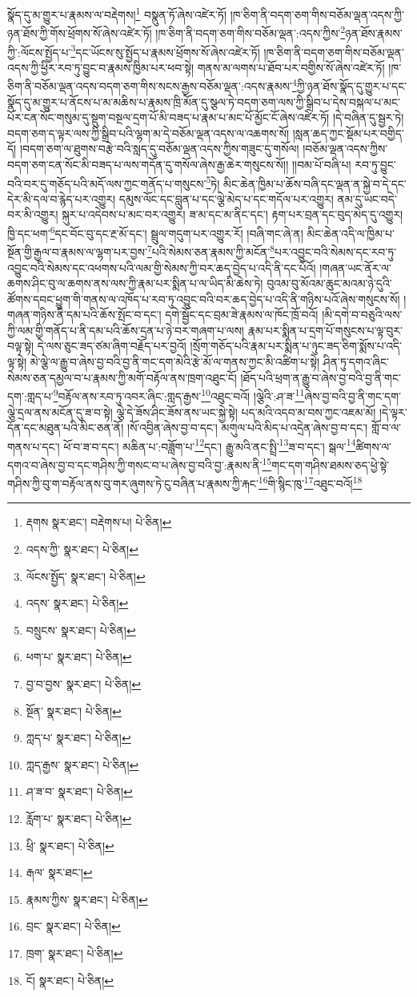 སྣོད་དུ་མ་གྱུར་པ་རྣམས་ལ་བརྡེགས།\footnote{རྡགས  སྣར་ཐང་། བརྡེགས་པ།  པེ་ཅིན། } བསྣུན་ཏོ་ཞེས་འཛེར་ཏོ། །ཁ་ཅིག་ནི་བདག་ཅག་གིས་བཅོམ་ལྡན་འདས་ཀྱི་ཉན་ཐོས་ཀྱི་གོས་ཕྲོགས་སོ་ཞེས་འཛེར་ཏོ། །ཁ་ཅིག་ནི་བདག་ཅག་གིས་བཅོམ་ལྡན་:འདས་ཀྱིས་\footnote{འདས་ཀྱི་  སྣར་ཐང་།  པེ་ཅིན། }ཉན་ཐོས་རྣམས་ཀྱི་:ལོངས་སྤྱོད་པ་\footnote{ལོངས་སྤྱོད་  སྣར་ཐང་།  པེ་ཅིན། }དང་ཡོངས་སུ་སྤྱོད་པ་རྣམས་ཕྲོགས་སོ་ཞེས་འཛེར་ཏོ། །ཁ་ཅིག་ནི་བདག་ཅག་གིས་བཅོམ་ལྡན་འདས་ཀྱི་ཕྱིར་རབ་ཏུ་བྱུང་བ་རྣམས་ཁྱིམ་པར་ཕབ་སྟེ། གནས་མ་ལགས་པ་ཐོབ་པར་བགྱིས་སོ་ཞེས་འཛེར་ཏོ། །ཁ་ཅིག་ནི་བཅོམ་ལྡན་འདས་བདག་ཅག་གིས་སངས་རྒྱས་བཅོམ་ལྡན་:འདས་རྣམས་\footnote{འདས་  སྣར་ཐང་།  པེ་ཅིན། }ཀྱི་ཉན་ཐོས་སྣོད་དུ་གྱུར་པ་དང་སྣོད་དུ་མ་གྱུར་པ་ནོངས་པ་མ་མཆིས་པ་རྣམས་ཁྲི་མོན་དུ་སྩལ་ཏེ་བདག་ཅག་ལས་ཀྱི་སྒྲིབ་པ་དེས་བསྐལ་པ་མང་པོར་ངན་སོང་གསུམ་དུ་སྡུག་བསྔལ་དྲག་པོ་མི་བཟད་པ་རྣམ་པ་མང་པོ་མྱོང་ངོ་ཞེས་འཛེར་ཏོ། །དེ་བཞིན་དུ་སྦྱར་ཏེ། བདག་ཅག་ད་ལྟར་ལས་ཀྱི་སྒྲིབ་པའི་ལྷག་མ་དེ་བཅོམ་ལྡན་འདས་ལ་འཆགས་སོ། །སླན་ཆད་ཀྱང་སྡོམ་པར་བགྱིད་དོ། །བདག་ཅག་ལ་ཐུགས་བརྩེ་བའི་སླད་དུ་བཅོམ་ལྡན་འདས་ཀྱིས་གཟུང་དུ་གསོལ། །བཅོམ་ལྡན་འདས་ཀྱིས་བདག་ཅག་ངན་སོང་མི་བཟད་པ་ལས་གདོན་དུ་གསོལ་ཞེས་རྒྱ་ཆེར་གསུངས་སོ།། །།བམ་པོ་བཞི་པ། རབ་ཏུ་བྱུང་བའི་བར་དུ་གཅོད་པའི་མདོ་ལས་ཀྱང་གནོད་པ་གསུངས་\footnote{བསྲུངས་  སྣར་ཐང་།  པེ་ཅིན། }ཏེ། མིང་ཆེན་ཁྱིམ་པ་ཆོས་བཞི་དང་ལྡན་ན་སྐྱེ་བ་དེ་དང་དེར་མི་དལ་བ་རྙེད་པར་འགྱུར། དམུས་ལོང་དང་བླུན་པ་དང་ལྕེ་མེད་པ་དང་གདོལ་པར་འགྱུར། ནམ་དུ་ཡང་བདེ་བར་མི་འགྱུར། སྐུར་པ་འདེབས་པ་མང་བར་འགྱུར། ཟ་མ་དང་མ་ནིང་དང་། རྟག་པར་བྲན་དང་བུད་མེད་དུ་འགྱུར། ཁྱི་དང་ཕག་\footnote{ཕག་པ་  སྣར་ཐང་།  པེ་ཅིན། }དང་བོང་བུ་དང་རྔ་མོ་དང་། སྦྲུལ་གདུག་པར་འགྱུར་རོ། །བཞི་གང་ཞེ་ན། མིང་ཆེན་འདི་ལ་ཁྱིམ་པ་སྔོན་གྱི་རྒྱལ་བ་རྣམས་ལ་ལྷག་པར་བྱས་\footnote{བྱ་བ་བྱས་  སྣར་ཐང་།  པེ་ཅིན། }པའི་སེམས་ཅན་རྣམས་ཀྱི་མངོན་\footnote{སྔོན་  སྣར་ཐང་།  པེ་ཅིན། }པར་འབྱུང་བའི་སེམས་དང་རབ་ཏུ་འབྱུང་བའི་སེམས་དང་འཕགས་པའི་ལམ་གྱི་སེམས་ཀྱི་བར་ཆད་བྱེད་པ་འདི་ནི་དང་པོའོ། །གཞན་ཡང་ནོར་ལ་ཆགས་ཤིང་བུ་ལ་ཆགས་ནས་ལས་ཀྱི་རྣམ་པར་སྨིན་པ་ལ་ཡིད་མི་ཆེས་ཏེ། བུའམ་བུ་མོའམ་ཆུང་མའམ་ཉེ་དུའི་ཚོགས་དབང་ཕྱུག་གི་གནས་ལ་འཁོད་པ་རབ་ཏུ་འབྱུང་བའི་བར་ཆད་བྱེད་པ་འདི་ནི་གཉིས་པའོ་ཞེས་གསུངས་སོ། །གཞན་གཉིས་ནི་དམ་པའི་ཆོས་སྤོང་བ་དང་། དགེ་སྦྱོང་དང་བྲམ་ཟེ་རྣམས་ལ་ཁོང་ཁྲོ་བའོ། །མི་དགེ་བ་བཅུའི་ལས་ཀྱི་ལམ་གྱི་གནོད་པ་ནི་དམ་པའི་ཆོས་དྲན་པ་ཉེ་བར་གཞག་པ་ལས། རྣམ་པར་སྨིན་པ་དྲག་པོ་གསུངས་པ་ལྟ་བུར་བལྟ་སྟེ། དེ་ལས་ཅུང་ཟད་ཙམ་ཞིག་བརྗོད་པར་བྱའོ། །སྲོག་གཅོད་པའི་རྣམ་པར་སྨིན་པ་ཉུང་ཟད་ཅིག་སྨོས་པ་འདི་ལྟ་སྟེ། མེ་ལྕེ་ལ་རྒྱུ་བ་ཞེས་བྱ་བའི་བྱ་ནི་གང་དག་མེའི་རྩེ་མོ་ལ་གནས་ཀྱང་མི་འཚིག་པ་སྟེ། ཤིན་ཏུ་དགའ་ཞིང་སེམས་ཅན་དམྱལ་བ་པ་རྣམས་ཀྱི་མགོ་བརྟོལ་ནས་ཁྲག་འཐུང་ངོ། །ཐོད་པའི་ཕྲག་ན་རྒྱུ་བ་ཞེས་བྱ་བའི་བྱ་ནི་གང་དག་:གླད་པ་\footnote{ཀླད་པ་  སྣར་ཐང་།  པེ་ཅིན། }བརྟོལ་ནས་རབ་ཏུ་འབར་ཞིང་:གླད་རྒྱས་\footnote{ཀླད་རྒྱས་  སྣར་ཐང་།  པེ་ཅིན། }འཐུང་བའོ། །ལྕེའི་:ཤ་ཟ་\footnote{ཤ་ཟ་བ་  སྣར་ཐང་།  པེ་ཅིན། }ཞེས་བྱ་བའི་བྱ་ནི་གང་དག་ལྕེ་དྲལ་ནས་མངོན་དུ་ཟ་བ་སྟེ། ལྕེ་དེ་ཟོས་ཤིང་ཟོས་ནས་ཡང་སྐྱེ་སྟེ། པད་མའི་འདབ་མ་བས་ཀྱང་འཇམ་མོ། །དེ་ལྟར་དོན་དང་མཐུན་པའི་མིང་ཅན་ནོ། །སོ་འབྱིན་ཞེས་བྱ་བ་དང་། མགུལ་པའི་མིད་པ་འདྲེན་ཞེས་བྱ་བ་དང་། གློ་བ་ལ་གནས་པ་དང་། ཕོ་བ་ཟ་བ་དང་། མཆིན་པ་:བཟློག་པ་\footnote{རློག་པ་  སྣར་ཐང་།  པེ་ཅིན། }དང་། རྒྱུ་མའི་ནང་སྤྲི་\footnote{ཕྲི་  སྣར་ཐང་།  པེ་ཅིན། }ཟ་བ་དང་། སྒལ་\footnote{རྒལ་  སྣར་ཐང་། }ཚིགས་ལ་དགའ་བ་ཞེས་བྱ་བ་དང་གཤིས་ཀྱི་གསང་བ་པ་ཞེས་བྱ་བའི་བྱ་:རྣམས་ནི་\footnote{རྣམས་ཀྱིས་  སྣར་ཐང་།  པེ་ཅིན། }གང་དག་གཤིས་ཐམས་ཅད་ཕྱེ་སྟེ་གཤིས་ཀྱི་བུ་ག་བརྟོལ་ནས་བུ་གར་ཞུགས་ཏེ་ངུ་བཞིན་པ་རྣམས་ཀྱི་རྐང་\footnote{བྲང་  སྣར་ཐང་།  པེ་ཅིན། }གི་སྙིང་ཁུ་\footnote{ཁྲག་  སྣར་ཐང་།  པེ་ཅིན། }འཐུང་བའོ།\footnote{ངོ།  སྣར་ཐང་།  པེ་ཅིན། } 